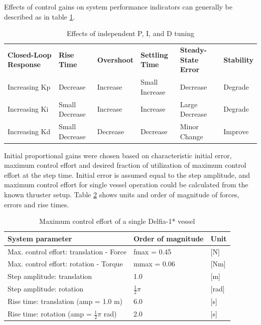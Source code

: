Effects of control gains on system performance indicators can generally be described as in table \ref{tableKEffects}.
\begin{table}[H]
	\centering
	\captionsetup{justification=centering}
	\caption{Effects of independent P, I, and D tuning \citet{ang2005pid}}
	\label{tableKEffects}
	\begin{tabular}{llllll}
		\cline{1-6}
		\textbf{Closed-Loop Response} & \textbf{Rise Time} & \textbf{Overshoot} & \textbf{Settling Time} & \textbf{Steady-State Error} & \textbf{Stability} \\ \cline{1-6}
		Increasing Kp                 & Decrease           & Increase           & Small Increase         & Decrease                    & Degrade            \\
		Increasing Ki                 & Small Decrease     & Increase           & Increase               & Large Decrease              & Degrade            \\
		Increasing Kd                 & Small Decrease     & Decrease           & Decrease               & Minor Change                & Improve            \\ \cline{1-6}
	\end{tabular}
\end{table}

Initial proportional gains were chosen based on characteristic initial error, maximum control effort and desired fraction of utilization of maximum control effort at the step time. Initial error is assumed equal to the step amplitude, and maximum control effort for single vessel operation could be calculated from the known thruster setup. Table \ref{orderDegreeSystemSingleDelfia} shows units and order of magnitude of forces, errors and rise times. 
\begin{table}[H]
	\centering
	\captionsetup{justification=centering}
	\caption{Maximum control effort of a single Delfia-1* vessel}
	\label{orderDegreeSystemSingleDelfia}
	\begin{tabular}{lll}
		System parameter                             & Order of magnitude & Unit      \\[2pt] \hline
		Max. control effort: translation - Force & fmax = 0.45        & {[}N{]}   \\
		Max. control effort: rotation - Torque   & mmax = 0.06        & {[}Nm{]}  \\
		Step amplitude: translation                  & 1.0          & {[}m{]}   \\
		Step amplitude: rotation                     & $\frac{1}{2} \pi$  & {[}rad{]} \\
		Rise time: translation (amp = 1.0 m)         &  6.0                  & {[}s{]}   \\
		Rise time: rotation  (amp = $\frac{1}{2} \pi$ rad)        &  2.0                  & {[}s{]}  \\ \hline
	\end{tabular}
\end{table}

